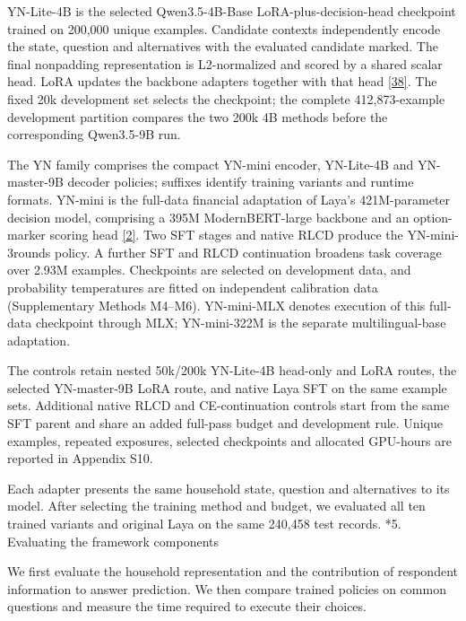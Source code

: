 \documentclass[10pt]{article}
\makeatletter
\renewcommand\section{\@startsection{section}{1}{\z@}{-2.2ex plus -1ex minus -.2ex}{.9ex plus .2ex}{\normalfont\large\mdseries}}
\makeatother
\begin{document}
YN-Lite-4B is the selected Qwen3.5-4B-Base LoRA-plus-decision-head checkpoint trained on 200,000 unique examples. Candidate contexts independently encode the state, question and alternatives with the evaluated candidate marked. The final nonpadding representation is L2-normalized and scored by a shared scalar head. LoRA updates the backbone adapters together with that head \href{https://arxiv.org/abs/2106.09685}{[38]}. The fixed 20k development set selects the checkpoint; the complete 412,873-example development partition compares the two 200k 4B methods before the corresponding Qwen3.5-9B run.

The YN family comprises the compact YN-mini encoder, YN-Lite-4B and YN-master-9B decoder policies; suffixes identify training variants and runtime formats. YN-mini is the full-data financial adaptation of Laya's 421M-parameter decision model, comprising a 395M ModernBERT-large backbone and an option-marker scoring head \href{https://github.com/LeonaDavinci/laya-system-one}{[2]}. Two SFT stages and native RLCD produce the YN-mini-3rounds policy. A further SFT and RLCD continuation broadens task coverage over 2.93M examples. Checkpoints are selected on development data, and probability temperatures are fitted on independent calibration data (Supplementary Methods M4--M6). YN-mini-MLX denotes execution of this full-data checkpoint through MLX; YN-mini-322M is the separate multilingual-base adaptation.

The controls retain nested 50k/200k YN-Lite-4B head-only and LoRA routes, the selected YN-master-9B LoRA route, and native Laya SFT on the same example sets. Additional native RLCD and CE-continuation controls start from the same SFT parent and share an added full-pass budget and development rule. Unique examples, repeated exposures, selected checkpoints and allocated GPU-hours are reported in Appendix S10.

Each adapter presents the same household state, question and alternatives to its model. After selecting the training method and budget, we evaluated all ten trained variants and original Laya on the same 240,458 test records.
\FloatBarrier
\section*{5. Evaluating the framework components}

We first evaluate the household representation and the contribution of respondent information to answer prediction. We then compare trained policies on common questions and measure the time required to execute their choices.
\end{document}
